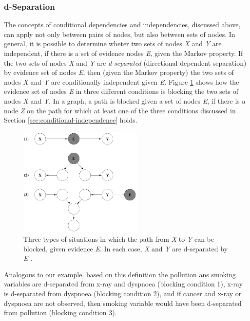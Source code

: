 \documentclass[11pt]{article}
\begin{document}
\subsubsection{d-Separation}

The concepts of conditional dependencies and independencies, discussed above,
can apply not only between pairs of nodes, but also between sets of nodes. In
general, it is possible to determine wheter two sets of nodes \textit{X} and
\textit{Y} are independent, if there is a set of evidence nodes \textit{E},
given the Markov property. If the two sets of nodes \textit{X} and \textit{Y}
are \textit{d-separated} (directional-dependent separation) by evidence set of
nodes \textit{E}, then (given the Markov property) the two sets of nodes
\textit{X} and \textit{Y} are conditionally independent given \textit{E}. Figure
\ref{fig:d-separation} shows how the evidence set of nodes \textit{E} in three
different conditions is blocking the two sets of nodes \textit{X} and
\textit{Y}. In a graph, a path is blocked given a set of nodes \textit{E}, if
there is a node \textit{Z} on the path for which at least one of the three
conditions discussed in Section \ref{sec:conditional-independence} holds.

\begin{figure}[tbh]
  \center
  \includegraphics[width=0.55\textwidth]{figure/d-separation.png}
  \caption{Three types of situations in which the path from \textit{X} to
  \textit{Y} can be blocked, given evidence \textit{E}. In each case, \textit{X}
  and \textit{Y} are d-separated by \textit{E}
  \cite{korb:bayesian-ai}.}
  \label{fig:d-separation}
\end{figure}

Analogous to our example, based on this definition the pollution ans smoking
variables are d-separated from x-ray and dyspnoea (blocking condition 1), x-ray
is d-separated from dyspnoea (blocking condition 2), and if cancer and x-ray or
dyspnoea are not observed, then smoking variable would have been d-separated
from pollution (blocking condition 3).
\end{document}
